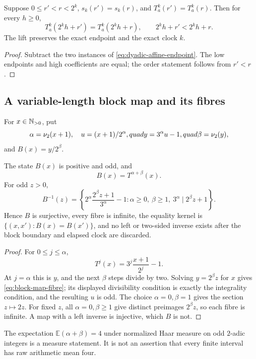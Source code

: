 \begin{proposition}
\label{prop:equal-clock-coalescence}
Suppose $0\le r'<r<2^k$,
$s_k(r')=s_k(r)$, and $T_a^k(r')=T_a^k(r)$.  Then for every $h\ge0$,
\[
 T_a^k(2^kh+r')=T_a^k(2^kh+r),
 \qquad2^kh+r'<2^kh+r.
\]
The lift preserves the exact endpoint and the exact clock $k$.
\end{proposition}

\begin{proof}
Subtract the two instances of
\eqref{eq:dyadic-affine-endpoint}.  The low endpoints and high coefficients
are equal; the order statement follows from $r'<r$.
\end{proof}

\subsection{A variable-length block map and its fibres}

For $x\in\mathbb N_{>0}$, put
\[
 \alpha=\nu_2(x+1),\quad u=(x+1)/2^\alpha,quad
 y=3^\alpha u-1,quad\beta=\nu_2(y),
\]
and $B(x)=y/2^\beta$.

\begin{proposition}
\label{prop:block-map-fibres}
The state $B(x)$ is positive and odd, and
\[
 B(x)=T^{\alpha+\beta}(x).
\]
For odd $z>0$,
\begin{equation}
 B^{-1}(z)=
 \left\{
 2^\alpha\frac{2^\beta z+1}{3^\alpha}-1:
 \alpha\ge0,\ \beta\ge1,\ 3^\alpha\mid2^\beta z+1
 \right\}.
 \label{eq:block-map-fibre}
\end{equation}
Hence $B$ is surjective, every fibre is infinite, the equality kernel is
$\{(x,x'):B(x)=B(x')\}$, and no left or two-sided inverse exists after the
block boundary and elapsed clock are discarded.
\end{proposition}

\begin{proof}
For $0\le j\le\alpha$,
\[
 T^j(x)=3^j\frac{x+1}{2^j}-1.
\]
At $j=\alpha$ this is $y$, and the next $\beta$ steps divide by two.
Solving $y=2^\beta z$ for $x$ gives \eqref{eq:block-map-fibre}; its displayed
divisibility condition is exactly the integrality condition, and the resulting
$u$ is odd.  The choice $\alpha=0,\beta=1$ gives the section $z\mapsto2z$.
For fixed $z$, all $\alpha=0,\beta\ge1$ give distinct preimages $2^\beta z$,
so each fibre is infinite.  A map with a left inverse is injective, which $B$
is not.
\end{proof}

\begin{nonclaim}
The expectation $\mathbb E(\alpha+\beta)=4$ under normalized Haar measure on
odd $2$-adic integers is a measure statement.  It is not an assertion that
every finite interval has raw arithmetic mean four.
\end{nonclaim}

